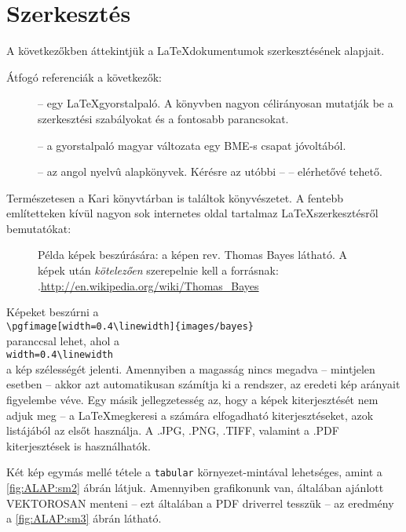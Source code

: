 \section{Szerkesztés}\label{sec:ALAP:szerkeszt}

A következőkben áttekintjük a \LaTeX dokumentumok szerkesztésének alapjait.

Átfogó referenciák a következők:
\begin{description}%
	\item[\cite{LatexNotSoShort}] -- egy \LaTeX gyorstalpaló. A könyvben nagyon
	  célirányosan mutatják be a szerkesztési szabályokat és a fontosabb parancsokat.
	\item[\cite{LatexNotSoShortHU}] -- a gyorstalpaló magyar változata egy BME-s
	  csapat jóvoltából.
	\item[\cite{Doob95,MittelbachEtAl04}] -- az angol nyelvû alapkönyvek. Kérésre az
	  utóbbi -- \cite{MittelbachEtAl04} -- elérhetővé tehető.
\end{description}
Természetesen a Kari könyvtárban is találtok könyvészetet. A fentebb említetteken kívül nagyon sok internetes oldal tartalmaz \LaTeX szerkesztésről bemutatókat:


\begin{figure}[t]
  \centering
  \caption[Példa képek beszúrására]%
  {Példa képek beszúrására: a képen rev. Thomas Bayes látható. A képek után {\em kötelezően} szerepelnie kell a forrásnak:\\
  {\white .}\hfill\url{http://en.wikipedia.org/wiki/Thomas_Bayes}}
  \label{fig:ALAP:sm1}
\end{figure}

Képeket beszúrni a\\
 \verb+\pgfimage[width=0.4\linewidth]{images/bayes}+\\
paranccsal lehet, ahol a\\
\verb+width=0.4\linewidth+ \\
a kép szélességét jelenti. Amennyiben a magasság nincs megadva -- mintjelen esetben -- akkor azt automatikusan számítja ki a rendszer, az eredeti kép arányait figyelembe véve.
Egy másik jellegzetesség az, hogy a képek kiterjesztését nem adjuk meg -- a \LaTeX megkeresi a számára elfogadható kiterjesztéseket, azok listájából az elsőt használja. A .JPG, .PNG, .TIFF, valamint a .PDF kiterjesztések is használhatók.

Két kép egymás mellé tétele a \verb+tabular+ környezet-mintával lehetséges, amint a \ref{fig:ALAP:sm2} ábrán látjuk.
Amennyiben grafikonunk van, általában ajánlott VEKTOROSAN menteni -- ezt általában a PDF driverrel tesszük -- az eredmény a \ref{fig:ALAP:sm3} ábrán látható.

